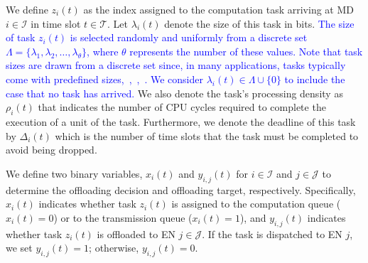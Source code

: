 \documentclass[12pt,draftclsnofoot,onecolumn]{IEEEtran}
\begin{document}
We define $z_i(t)$ as the index assigned to the computation task arriving at MD $i \in \mathcal{I}$ in time slot $t \in \mathcal{T}$. Let $\lambda_i(t)$ denote the size of this task in bits. \textcolor{blue}{The size of task \( z_i(t) \) is selected randomly and uniformly from a discrete set \( \Lambda = \{\lambda_1, \lambda_2, \ldots, \lambda_{\theta}\} \), where \( \theta \) represents the number of these values. Note that task sizes are drawn from a discrete set since, in many applications, tasks typically come with predefined sizes,~\cite{wang2020intelligent},~\cite{zhang2019toward},~\cite{allahham2022multi}. We consider $\lambda_i(t) \in \Lambda \cup \{0\}$ to include the case that no task has arrived.} We also denote the task's processing density as $\rho_i(t)$ that indicates the number of CPU cycles required to complete the execution of a unit of the task. Furthermore, we denote the deadline of this task by $\Delta_i(t)$ which is the number of time slots that the task must be completed to avoid being dropped.


We define two binary variables, $x_i(t)$ and $y_{i,j}(t)$ for $i \in \mathcal{I}$ and $j \in \mathcal{J}$ to determine the offloading decision and offloading target, respectively. Specifically, $x_i(t)$ indicates whether task $z_i(t)$ is assigned to the computation queue ($x_i(t) = 0$) or to the transmission queue ($x_i(t) = 1$), and $y_{i,j}(t)$ indicates whether task $z_i(t)$ is offloaded to EN $j \in \mathcal{J}$. If the task is dispatched to EN $j$, we set $y_{i,j}(t) = 1$; otherwise, $y_{i,j}(t) = 0$.
\end{document}
